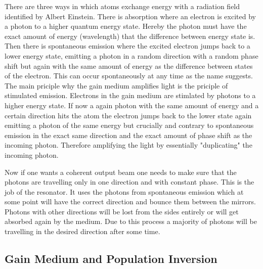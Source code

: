 \documentclass[a4paper,10pt]{article}
\begin{document}
    There are three ways in which atoms exchange energy with a radiation
    field~\cite{lasers_liverpool} identified by Albert Einstein.
    There is absorption where an electron is excited by a photon to a higher
    quantum energy state.
    Hereby the photon must have the exact amount of energy (wavelength)
    that the difference between energy state is.
    Then there is spontaneous emission where the excited electron jumps
    back to a lower energy state, emitting a photon in a random direction
    with a random phase shift
    but again with the same amount of energy as the difference between 
    states of the electron.
    This can occur spontaneously at any time as the name suggests. 
    The main priciple why the gain medium amplifies light is the priciple
    of stimulated emission.
    Electrons in the gain medium are stimlated by photons to a higher
    energy state.
    If now a again photon with the same amount of energy and a certain
    direction hits the atom the electron jumps back to the lower state
    again emitting a photon of the same energy but crucially and contrary
    to spontaneous emission in the exact same direction and the exact
    amount of phase shift as the incoming photon.
    Therefore amplifying the light by essentially "duplicating" the incoming
    photon.

    Now if one wants a coherent output beam one needs to make sure that
    the photons are travelling only in one direction and with constant
    phase.
    This is the job of the resonator.
    It uses the photons from spontaneous emission which at some point
    will have the correct direction and bounce them between the mirrors.
    Photons with other directions will be lost from the sides entirely
    or will get absorbed again by the medium.
    Due to this process a majority of photons will be travelling in the
    desired direction after some time.

    \subsection{Gain Medium and Population Inversion}
\end{document}
